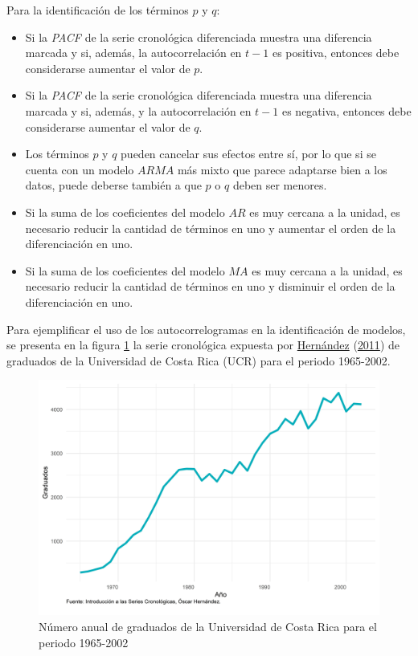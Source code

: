\documentclass[
]{article}
\providecommand{\tightlist}{%
  \setlength{\itemsep}{0pt}\setlength{\parskip}{0pt}}
\begin{document}
Para la identificación de los términos \(p\) y \(q\):

\begin{itemize}
\tightlist
\item
  Si la \emph{PACF} de la serie cronológica diferenciada muestra una
  diferencia marcada y si, además, la autocorrelación en \(t-1\) es
  positiva, entonces debe considerarse aumentar el valor de \(p\).
\item
  Si la \emph{PACF} de la serie cronológica diferenciada muestra una
  diferencia marcada y si, además, y la autocorrelación en \(t-1\) es
  negativa, entonces debe considerarse aumentar el valor de \(q\).
\item
  Los términos \(p\) y \(q\) pueden cancelar sus efectos entre sí, por
  lo que si se cuenta con un modelo \(ARMA\) más mixto que parece
  adaptarse bien a los datos, puede deberse también a que \(p\) o \(q\)
  deben ser menores.
\item
  Si la suma de los coeficientes del modelo \(AR\) es muy cercana a la
  unidad, es necesario reducir la cantidad de términos en uno y aumentar
  el orden de la diferenciación en uno.
\item
  Si la suma de los coeficientes del modelo \(MA\) es muy cercana a la
  unidad, es necesario reducir la cantidad de términos en uno y
  disminuir el orden de la diferenciación en uno.
\end{itemize}

Para ejemplificar el uso de los autocorrelogramas en la identificación
de modelos, se presenta en la figura \ref{fig:ejemplo_ucr} la serie
cronológica expuesta por \protect\hyperlink{ref-oscarh-1}{Hernández}
(\protect\hyperlink{ref-oscarh-1}{2011}) de graduados de la Universidad
de Costa Rica (UCR) para el periodo 1965-2002.

\begin{figure}[!h]
\includegraphics[width=1\linewidth,height=1\textheight]{Tesis_files/figure-latex/ejemplo_ucr-1} \caption{Número anual de graduados de la Universidad de Costa Rica para el periodo 1965-2002}\label{fig:ejemplo_ucr}
\end{figure}
\end{document}
